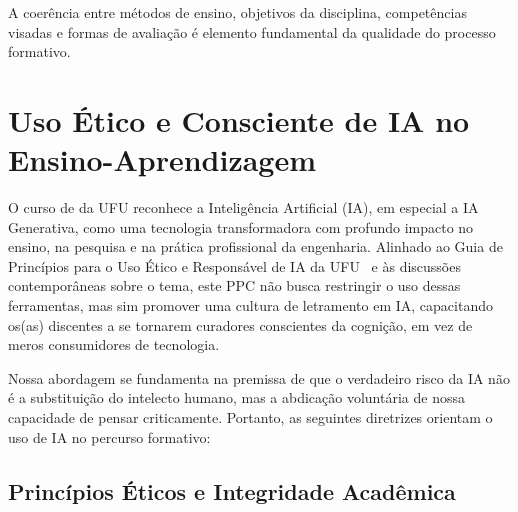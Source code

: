 A coerência entre métodos de ensino, objetivos da disciplina, competências visadas e formas de avaliação é elemento fundamental da qualidade do processo formativo.

\section{Uso Ético e Consciente de IA no Ensino-Aprendizagem}
\label{sec:IA-UFU}

O curso de \ppccurso da UFU reconhece a Inteligência Artificial (IA), em especial a IA Generativa, como uma tecnologia transformadora com profundo impacto no ensino, na pesquisa e na prática profissional da engenharia. Alinhado ao Guia de Princípios para o Uso Ético e Responsável de IA da UFU~\cite{UFU2025GuiaIA} e às discussões contemporâneas sobre o tema, este PPC não busca restringir o uso dessas ferramentas, mas sim promover uma cultura de letramento em IA, capacitando os(as) discentes a se tornarem curadores conscientes da cognição, em vez de meros consumidores de tecnologia.

Nossa abordagem se fundamenta na premissa de que o verdadeiro risco da IA não é a substituição do intelecto humano, mas a abdicação voluntária de nossa capacidade de pensar criticamente. Portanto, as seguintes diretrizes orientam o uso de IA no percurso formativo:

\subsection{Princípios Éticos e Integridade Acadêmica}

